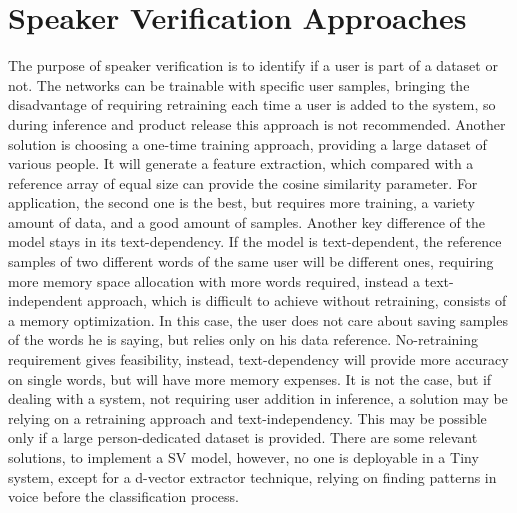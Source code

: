 \section{Speaker Verification Approaches}
\label{subsec:sv approaches}
The purpose of speaker verification is to identify if a user is part of a dataset or not. The networks can be trainable with specific user samples, bringing the disadvantage of requiring retraining each time a user is added to the system, so during inference and product release this approach is not recommended. Another solution is choosing a one-time training approach, providing a large dataset of various people. It will generate a feature extraction, which compared with a reference array of equal size can provide the cosine similarity parameter. For application, the second one is the best, but requires more training, a variety amount of data, and a good amount of samples. Another key difference of the model stays in its text-dependency. If the model is text-dependent, the reference samples of two different words of the same user will be different ones, requiring more memory space allocation with more words required, instead a text-independent approach, which is difficult to achieve without retraining, consists of a memory optimization. In this case, the user does not care about saving samples of the words he is saying, but relies only on his data reference. No-retraining requirement gives feasibility, instead, text-dependency will provide more accuracy on single words, but will have more memory expenses. It is not the case, but if dealing with a system, not requiring user addition in inference, a solution may be relying on a retraining approach and text-independency. This may be possible only if a large person-dedicated dataset is provided. There are some relevant solutions, to implement a SV model, however, no one is deployable in a Tiny system, except for a d-vector extractor technique, relying on finding patterns in voice before the classification process.\cite{dvector_extractor_TinySV}\newline 


